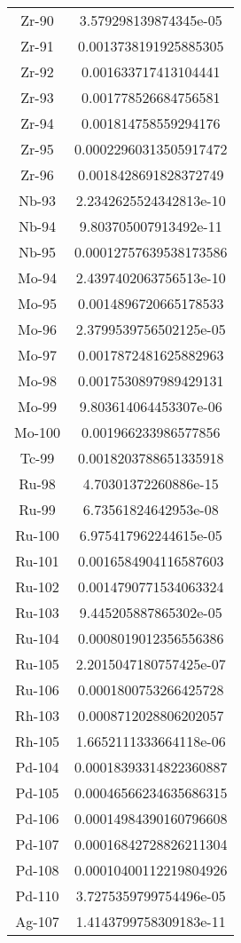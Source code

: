 \begin{table}[h!]
\begin{tabular}{|| c || c |}
Zr-90 & 3.579298139874345e-05 \\
Zr-91 & 0.0013738191925885305 \\
Zr-92 & 0.001633717413104441 \\
Zr-93 & 0.001778526684756581 \\
Zr-94 & 0.001814758559294176 \\
Zr-95 & 0.00022960313505917472 \\
Zr-96 & 0.0018428691828372749 \\
Nb-93 & 2.2342625524342813e-10 \\
Nb-94 & 9.803705007913492e-11 \\
Nb-95 & 0.00012757639538173586 \\
Mo-94 & 2.4397402063756513e-10 \\
Mo-95 & 0.0014896720665178533 \\
Mo-96 & 2.3799539756502125e-05 \\
Mo-97 & 0.0017872481625882963 \\
Mo-98 & 0.0017530897989429131 \\
Mo-99 & 9.803614064453307e-06 \\
Mo-100 & 0.001966233986577856 \\
Tc-99 & 0.0018203788651335918 \\
Ru-98 & 4.70301372260886e-15 \\
Ru-99 & 6.73561824642953e-08 \\
Ru-100 & 6.975417962244615e-05 \\
Ru-101 & 0.0016584904116587603 \\
Ru-102 & 0.0014790771534063324 \\
Ru-103 & 9.445205887865302e-05 \\
Ru-104 & 0.0008019012356556386 \\
Ru-105 & 2.2015047180757425e-07 \\
Ru-106 & 0.0001800753266425728 \\
Rh-103 & 0.0008712028806202057 \\
Rh-105 & 1.6652111333664118e-06 \\
Pd-104 & 0.00018393314822360887 \\
Pd-105 & 0.00046566234635686315 \\
Pd-106 & 0.00014984390160796608 \\
Pd-107 & 0.00016842728826211304 \\
Pd-108 & 0.00010400112219804926 \\
Pd-110 & 3.7275359799754496e-05 \\
Ag-107 & 1.4143799758309183e-11 \\

\end{tabular}
\end{table}
